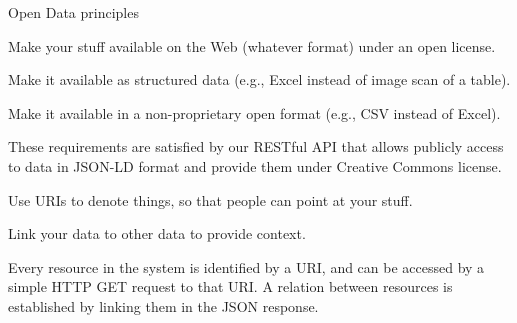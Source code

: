 \begin{frame}[allowframebreaks]{Open Data principles\autocite{Berners-Lee_2006}}
	\begin{block}{\faStar\faStarO\faStarO\faStarO\faStarO}
		Make your stuff available on the Web (whatever format) under an open
		license.
	\end{block}
	\vspace*{-8pt}
	\begin{block}{\faStar\faStar\faStarO\faStarO\faStarO}
		Make it available as structured data (e.g., Excel instead of image scan
		of a table).
	\end{block}
	\vspace*{-8pt}
	\begin{block}{\faStar\faStar\faStar\faStarO\faStarO}
		Make it available in a non-proprietary open format (e.g., CSV instead of
		Excel).
	\end{block}
	These requirements are satisfied by our RESTful API that allows
	publicly access to data in JSON-LD\autocite{Sporny_2014} format and provide
	them under Creative Commons license.

	\framebreak

	\begin{block}{\faStar\faStar\faStar\faStar\faStarO}
		Use URIs to denote things, so that people can point at your stuff.
	\end{block}
	\vspace*{-8pt}
	\begin{block}{\faStar\faStar\faStar\faStar\faStar}
		Link your data to other data to provide context.
	\end{block}
	Every resource in the system is identified by a URI, and can be accessed
	by a simple HTTP GET request to that URI. A relation between resources
	is established by linking them in the JSON response.
\end{frame}
